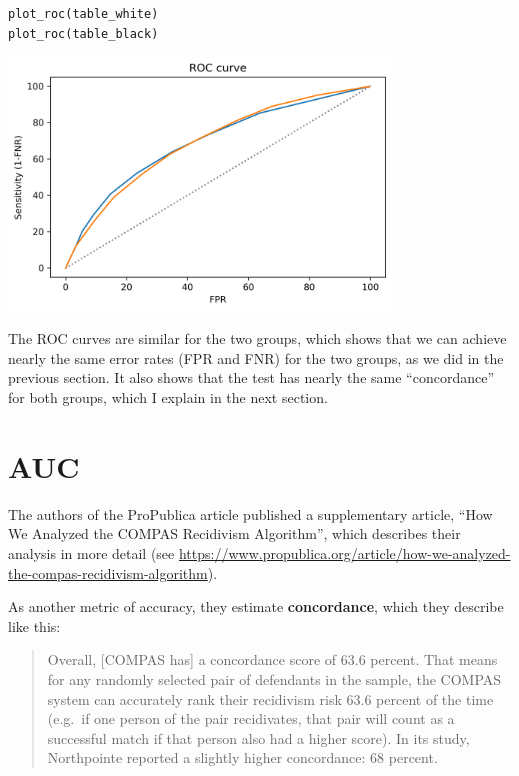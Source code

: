 \begin{lstlisting}[]
plot_roc(table_white)
plot_roc(table_black)
\end{lstlisting}

\begin{center}
\includegraphics[width=4in]{chapters/02_calibration_files/02_calibration_66_0.png}
\end{center}

The ROC curves are similar for the two groups, which shows that we can
achieve nearly the same error rates (FPR and FNR) for the two groups, as
we did in the previous section. It also shows that the test has nearly
the same ``concordance'' for both groups, which I explain in the next
section.

\hypertarget{auc}{%
\section{AUC}\label{auc}}

The authors of the ProPublica article published a supplementary article,
``How We Analyzed the COMPAS Recidivism Algorithm'', which describes
their analysis in more detail (see
\url{https://www.propublica.org/article/how-we-analyzed-the-compas-recidivism-algorithm}).

As another metric of accuracy, they estimate \textbf{concordance}, which
they describe like this:

\begin{quote}
Overall, {[}COMPAS has{]} a concordance score of 63.6 percent. That
means for any randomly selected pair of defendants in the sample, the
COMPAS system can accurately rank their recidivism risk 63.6 percent of
the time (e.g.~if one person of the pair recidivates, that pair will
count as a successful match if that person also had a higher score). In
its study, Northpointe reported a slightly higher concordance: 68
percent.
\end{quote}

